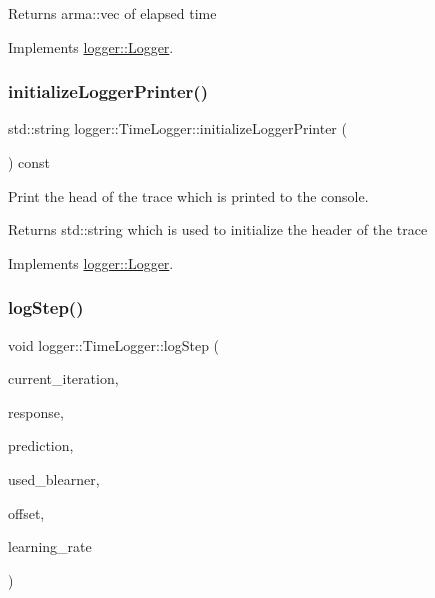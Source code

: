 \begin{DoxyReturn}{Returns}
{\ttfamily arma\+::vec} of elapsed time 
\end{DoxyReturn}


Implements \mbox{\hyperlink{classlogger_1_1_logger_aa4fc254c532172db3404b7c0bcd17092}{logger\+::\+Logger}}.

\mbox{\label{classlogger_1_1_time_logger_a60f041a21157b1049f512d325c3d35ac}} 
\subsubsection{\texorpdfstring{initialize\+Logger\+Printer()}{initializeLoggerPrinter()}}
{\footnotesize\ttfamily std\+::string logger\+::\+Time\+Logger\+::initialize\+Logger\+Printer (\begin{DoxyParamCaption}{ }\end{DoxyParamCaption}) const\hspace{0.3cm}{\ttfamily [virtual]}}



Print the head of the trace which is printed to the console. 

\begin{DoxyReturn}{Returns}
{\ttfamily std\+::string} which is used to initialize the header of the trace 
\end{DoxyReturn}


Implements \mbox{\hyperlink{classlogger_1_1_logger_a825f96e8564ac4013ff09ef842c0aeec}{logger\+::\+Logger}}.

\mbox{\label{classlogger_1_1_time_logger_a9498311652805868b5a0ea7f5480f0be}} 
\subsubsection{\texorpdfstring{log\+Step()}{logStep()}}
{\footnotesize\ttfamily void logger\+::\+Time\+Logger\+::log\+Step (\begin{DoxyParamCaption}\item[{const unsigned int \&}]{current\+\_\+iteration,  }\item[{const arma\+::vec \&}]{response,  }\item[{const arma\+::vec \&}]{prediction,  }\item[{\mbox{\hyperlink{classblearner_1_1_baselearner}{blearner\+::\+Baselearner}} $\ast$}]{used\+\_\+blearner,  }\item[{const double \&}]{offset,  }\item[{const double \&}]{learning\+\_\+rate }\end{DoxyParamCaption})\hspace{0.3cm}{\ttfamily [virtual]}}



